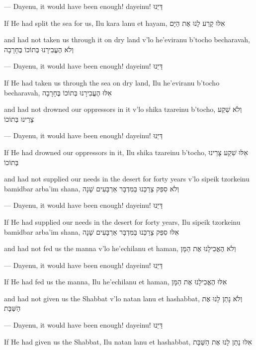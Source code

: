 {\begin{itemize}
{		— Dayenu, it would have been enough!
		dayeinu!
		\texthebrew{דַּיֵּנוּ}
		
		If He had split the sea for us,
		Ilu kara lanu et hayam,
		\texthebrew{אִלּוּ קָרַע לָנוּ אֶת הַיָּם}
		
		and had not taken us through it on dry land
		v'lo he'eviranu b'tocho becharavah,
		\texthebrew{וְלֹא הֶעֱבִירָנוּ בְּתוֹכוֹ בֶּחָרָבָה}

		— Dayenu, it would have been enough!		
		dayeinu!
		\texthebrew{דַּיֵּנוּ}

		If He had taken us through the sea on dry land,		
		Ilu he'eviranu b'tocho becharavah,
		\texthebrew{אִלּוּ הֶעֱבִירָנוּ בְּתוֹכוֹ בֶּחָרָבָה}

		and had not drowned our oppressors in it		
		v'lo shika tzareinu b'tocho,
		\texthebrew{וְלֹא שִׁקַע צָרֵינוּ בְּתוֹכוֹ}

		— Dayenu, it would have been enough!
		dayeinu!
		\texthebrew{דַּיֵּנוּ}

		If He had drowned our oppressors in it,
		Ilu shika tzareinu b'tocho,
		\texthebrew{אִלּוּ שִׁקַע צָרֵינוּ בְּתוֹכוֹ}

		and had not supplied our needs in the desert for forty years
		v'lo sipeik tzorkeinu bamidbar arba'im shana,
		\texthebrew{וְלֹא סִפֵּק צָרַכֵּנוּ בַּמִּדְבָּר אַרְבָּעִים שָׁנָה}

		— Dayenu, it would have been enough!
		dayeinu!
		\texthebrew{דַּיֵּנוּ}

		If He had supplied our needs in the desert for forty years,
		Ilu sipeik tzorkeinu bamidbar arba'im shana,
		\texthebrew{אִלּוּ סִפֵּק צָרַכֵּנוּ בַּמִּדְבָּר אַרְבָּעִים שָׁנָה}
		
		and had not fed us the manna
		v'lo he'echilanu et haman,
		\texthebrew{וְלֹא הֶאֱכִילָנוּ אֶת הַמָּן}

		— Dayenu, it would have been enough!
		dayeinu!
		\texthebrew{דַּיֵּנוּ}

		If He had fed us the manna,		
		Ilu he'echilanu et haman,
		\texthebrew{אִלּוּ הֶאֱכִילָנוּ אֶת הַמָּן}
		
		and had not given us the Shabbat
		v'lo natan lanu et hashabbat,
		\texthebrew{וְלֹא נָתַן לָנוּ אֶת הַשַּׁבָּת}		
		
		— Dayenu, it would have been enough!
		dayeinu!
		\texthebrew{דַּיֵּנוּ}	
		
		If He had given us the Shabbat,
		Ilu natan lanu et hashabbat,
		\texthebrew{אִלּוּ נָתַן לָנוּ אֶת הַשַּׁבָּת}
		
}
\end{itemize}}
